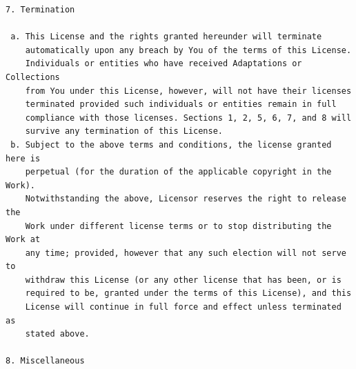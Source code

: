 \documentclass[10pt]{book}              %
\begin{document}
\begin{appendices}
\begin{verbatim}
7. Termination

 a. This License and the rights granted hereunder will terminate
    automatically upon any breach by You of the terms of this License.
    Individuals or entities who have received Adaptations or Collections
    from You under this License, however, will not have their licenses
    terminated provided such individuals or entities remain in full
    compliance with those licenses. Sections 1, 2, 5, 6, 7, and 8 will
    survive any termination of this License.
 b. Subject to the above terms and conditions, the license granted here is
    perpetual (for the duration of the applicable copyright in the Work).
    Notwithstanding the above, Licensor reserves the right to release the
    Work under different license terms or to stop distributing the Work at
    any time; provided, however that any such election will not serve to
    withdraw this License (or any other license that has been, or is
    required to be, granted under the terms of this License), and this
    License will continue in full force and effect unless terminated as
    stated above.

8. Miscellaneous


\end{verbatim}
\end{appendices}
\end{document}
